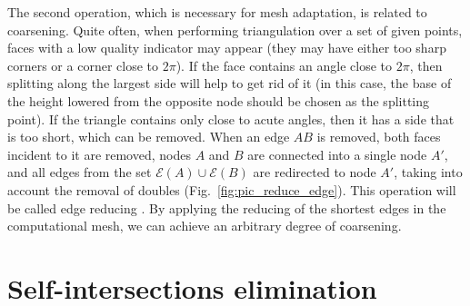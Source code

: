 \documentclass[
11pt,%
tightenlines,%
twoside,%
onecolumn,%
nofloats,%
nobibnotes,%
nofootinbib,%
superscriptaddress,%
noshowpacs,%
centertags]%
{revtex4-2}
\begin{document}
The second operation, which is necessary for mesh adaptation, is related to coarsening.
Quite often, when performing triangulation over a set of given points, faces with a low quality indicator may appear (they may have either too sharp corners or a corner close to $2 \pi$).
If the face contains an angle close to $2 \pi$, then splitting along the largest side will help to get rid of it (in this case, the base of the height lowered from the opposite node should be chosen as the splitting point).
If the triangle contains only close to acute angles, then it has a side that is too short, which can be removed.
When an edge $AB$ is removed, both faces incident to it are removed, nodes $A$ and $B$ are connected into a single node $A'$, and all edges from the set $\mathscr{E}(A) \cup \mathscr{E} (B)$ are redirected to node $A'$, taking into account the removal of doubles (Fig.~\ref{fig:pic_reduce_edge}).
This operation will be called edge reducing \cite{Panchal}.
By applying the reducing of the shortest edges in the  computational
mesh, we can achieve an arbitrary degree of coarsening.


\section{Self-intersections elimination}
\end{document}
